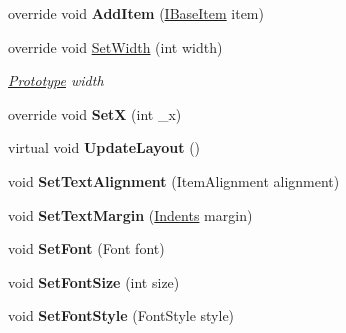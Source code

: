 \begin{DoxyCompactItemize}
\mbox{\label{class_space_v_i_l_1_1_tree_item_afc527b031a24b41b87a112499dbf519d}} 
override void {\bfseries Add\+Item} (\mbox{\hyperlink{interface_space_v_i_l_1_1_core_1_1_i_base_item}{I\+Base\+Item}} item)
\item 
override void \mbox{\hyperlink{class_space_v_i_l_1_1_tree_item_aa10abe8a9dafe4d597e041500618ec03}{Set\+Width}} (int width)
\begin{DoxyCompactList}\small\item\em \mbox{\hyperlink{class_space_v_i_l_1_1_prototype}{Prototype}} width \end{DoxyCompactList}\item 
\mbox{\label{class_space_v_i_l_1_1_tree_item_a2877488261c222803eccf707acb64996}} 
override void {\bfseries SetX} (int \+\_\+x)
\item 
\mbox{\label{class_space_v_i_l_1_1_tree_item_a7d2a8703ad575a79706ad74261f62a8e}} 
virtual void {\bfseries Update\+Layout} ()
\item 
\mbox{\label{class_space_v_i_l_1_1_tree_item_a4efa275845c0e6504b3e2765a9fc4af1}} 
void {\bfseries Set\+Text\+Alignment} (Item\+Alignment alignment)
\item 
\mbox{\label{class_space_v_i_l_1_1_tree_item_a11b424f22eb57f927c717860e190f359}} 
void {\bfseries Set\+Text\+Margin} (\mbox{\hyperlink{struct_space_v_i_l_1_1_decorations_1_1_indents}{Indents}} margin)
\item 
\mbox{\label{class_space_v_i_l_1_1_tree_item_a3930da98caf1fc9041c3c87a321636d7}} 
void {\bfseries Set\+Font} (Font font)
\item 
\mbox{\label{class_space_v_i_l_1_1_tree_item_a71f1e4209d1ef1ee86f4460c2dd9bc05}} 
void {\bfseries Set\+Font\+Size} (int size)
\item 
\mbox{\label{class_space_v_i_l_1_1_tree_item_a659f7b23dee59387ae2b5e6b0d52e95b}} 
void {\bfseries Set\+Font\+Style} (Font\+Style style)
\item 

\end{DoxyCompactItemize}
